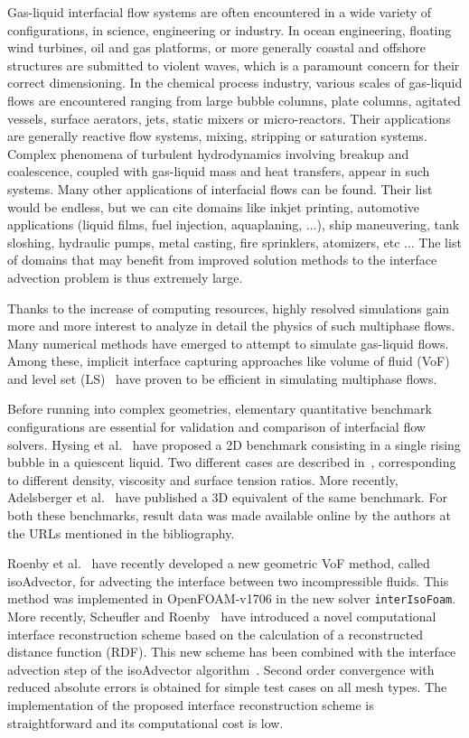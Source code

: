 \documentclass[review]{elsarticle}
\begin{document}
Gas-liquid interfacial flow systems are often encountered in a wide variety of configurations, in science, engineering or industry. In ocean engineering, floating wind turbines, oil and gas platforms, or more generally coastal and offshore structures are submitted to violent waves, which is a paramount concern for their correct dimensioning. In the chemical process industry, various scales of gas-liquid flows are encountered ranging from large bubble columns, plate columns, agitated vessels, surface aerators, jets, static mixers or micro-reactors. Their applications are generally reactive flow systems, mixing, stripping or saturation systems. Complex phenomena of turbulent hydrodynamics involving breakup and coalescence, coupled with gas-liquid mass and heat transfers, appear in such systems. Many other applications of interfacial flows can be found. Their list would be endless, but we can cite domains like inkjet printing, automotive applications (liquid films, fuel injection, aquaplaning, ...), ship maneuvering, tank sloshing, hydraulic pumps, metal casting, fire sprinklers, atomizers, etc ... The list of domains that may benefit from improved solution methods to the interface advection problem is thus extremely large. 

Thanks to the increase of computing resources, highly resolved simulations gain more and more 
interest to analyze in detail the physics of such multiphase flows. Many numerical methods 
have emerged to attempt to simulate gas-liquid flows. Among these, implicit interface capturing 
approaches like volume of fluid (VoF)~\cite{HIRT1981201} and level set (LS)~\cite{OSHER198812} 
have proven to be efficient in simulating multiphase flows. 

Before running into complex geometries, elementary quantitative benchmark configurations are 
essential for validation and comparison of interfacial flow solvers. Hysing et 
al.~\cite{Hysing2009} have proposed a 2D benchmark consisting in a single rising bubble in 
a quiescent liquid. Two different cases are described in~\cite{Hysing2009}, corresponding to 
different density, viscosity and surface tension ratios. More recently, Adelsberger et al.~\cite{Adelsberger2014} have published a 3D equivalent of the same benchmark. For both these benchmarks, result data was made available online by the authors at the URLs mentioned in the bibliography. 

Roenby et al.~\cite{Roenby160405} have recently developed a new geometric VoF method, called isoAdvector, for advecting the interface between two incompressible fluids. This method was implemented in OpenFOAM-v1706 in the new solver \verb+interIsoFoam+. 
More recently, Scheufler and Roenby~\cite{Scheufler2018} have introduced a novel computational interface reconstruction scheme based on the calculation of a reconstructed distance function (RDF). This new scheme has been combined with the interface advection step of the isoAdvector algorithm~\cite{Scheufler2018}. Second order convergence with reduced absolute errors is obtained for simple test cases on all mesh types. The implementation of the proposed interface reconstruction scheme is straightforward and its computational cost is low. 
\end{document}
